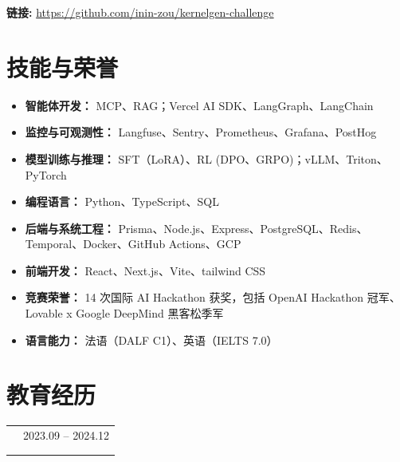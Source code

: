\documentclass{resume}
\makeatletter
\newcommand{\DetailFont}{%
  \zihao{-5}
}
\newcommand{\ProjectLink}[1]{%
  \par\nopagebreak
  {\DetailFont
    \textbf{链接:} \url{#1}\par
  }
}
\newcommand{\Education}[4]{%
  \par
  \Needspace{4\baselineskip}%

  \begin{tabularx}{\linewidth}{
    @{}
    >{\raggedright\arraybackslash}X
    @{\hspace{10pt}}
    r
    @{}
  }
    {\zihao{5}\heiti\bfseries #1}
      & {\DetailFont #2}\\[2pt]

    \multicolumn{2}{@{}p{\linewidth}@{}}{
      {\zihao{5}\textit{#3}}
    }\\[1pt]

    \multicolumn{2}{@{}p{\linewidth}@{}}{
      {\DetailFont #4}
    }\\
  \end{tabularx}\par
}
\makeatother
\begin{document}
\ProjectLink{https://github.com/inin-zou/kernelgen-challenge}


\section{技能与荣誉}

\begin{itemize}[
  leftmargin=0pt,
  label={},
  itemsep=4pt,
  parsep=0pt,
  topsep=0pt,
  partopsep=0pt
]
  \item \textbf{智能体开发：}
  MCP、RAG；Vercel AI SDK、LangGraph、LangChain

  \item \textbf{监控与可观测性：}
  Langfuse、Sentry、Prometheus、Grafana、PostHog

  \item \textbf{模型训练与推理：}
  SFT（LoRA）、RL (DPO、GRPO)；vLLM、Triton、PyTorch

  \item \textbf{编程语言：}
  Python、TypeScript、SQL

  \item \textbf{后端与系统工程：}
  Prisma、Node.js、Express、PostgreSQL、Redis、
  Temporal、Docker、GitHub Actions、GCP

  \item \textbf{前端开发：}
  React、Next.js、Vite、tailwind CSS

  \item \textbf{竞赛荣誉：}
  14 次国际 AI Hackathon 获奖，包括 OpenAI Hackathon 冠军、
  Lovable x Google DeepMind 黑客松季军

  \item \textbf{语言能力：}
  法语（DALF C1）、英语（IELTS 7.0）
\end{itemize}


\section{教育经历}

\Education
  {巴黎文理研究大学 -- PSL（Université Paris Dauphine -- PSL）}
  {2023.09 -- 2024.12}
  {\textnormal{计算机科学 | }硕士学位}
  {\textbf{QS World University Rankings 2025：\#24}
   | \textbf{年级排名第 10}}
\end{document}
